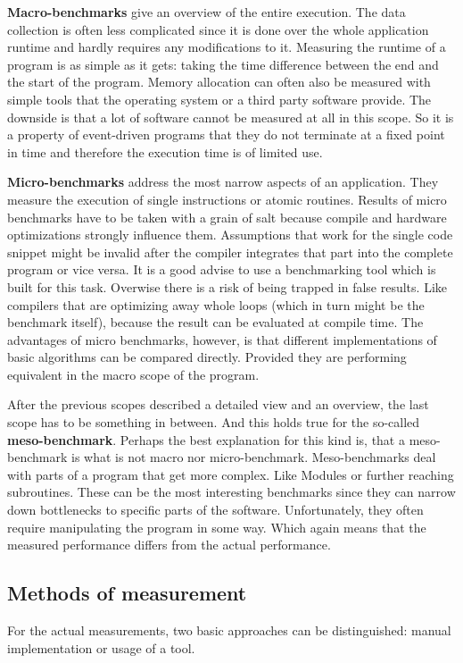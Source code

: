 \textbf{Macro-benchmarks} give an overview of the entire execution. The data collection is often less complicated since it is done over the whole application runtime and hardly requires any modifications to it. Measuring the runtime of a program is as simple as it gets: taking the time difference between the end and the start of the program. Memory allocation can often also be measured with simple tools that the operating system or a third party software provide. The downside is that a lot of software cannot be measured at all in this scope. So it is a property of event-driven programs that they do not terminate at a fixed point in time and therefore the execution time is of limited use.

\textbf{Micro-benchmarks} address the most narrow aspects of an application. They measure the execution of single instructions or atomic routines. Results of micro benchmarks have to be taken with a grain of salt because compile and hardware optimizations strongly influence them. Assumptions that work for the single code snippet might be invalid after the compiler integrates that part into the complete program or vice versa. It is a good advise to use a benchmarking tool which is built for this task. Overwise there is a risk of being trapped in false results. Like compilers that are optimizing away whole loops (which in turn might be the benchmark itself), because the result can be evaluated at compile time. The advantages of micro benchmarks, however, is that different implementations of basic algorithms can be compared directly. Provided they are performing equivalent in the macro scope of the program.

After the previous scopes described a detailed view and an overview, the last scope has to be something in between. And this holds true for the so-called \textbf{meso-benchmark}. Perhaps the best explanation for this kind is, that a meso-benchmark is what is not macro nor micro-benchmark. Meso-benchmarks deal with parts of a program that get more complex. Like Modules or further reaching subroutines. These can be the most interesting benchmarks since they can narrow down bottlenecks to specific parts of the software. Unfortunately, they often require manipulating the program in some way. Which again means that the measured performance differs from the actual performance.


\subsection{Methods of measurement}
\label{BenchMethods}
For the actual measurements, two basic approaches can be distinguished: manual implementation or usage of a tool.

